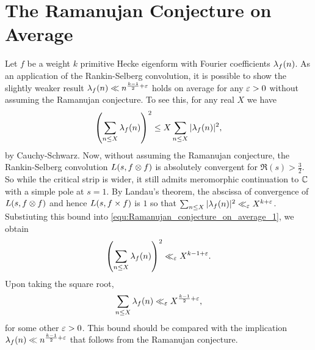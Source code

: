     \section{The Ramanujan Conjecture on Average}
      Let $f$ be a weight $k$ primitive Hecke eigenform with Fourier coefficients $\lambda_{f}(n)$. As an application of the Rankin-Selberg convolution, it is possible to show the slightly weaker result $\lambda_{f}(n) \ll n^{\frac{k-1}{2}+\varepsilon}$ holds on average for any $\varepsilon > 0$ without assuming the Ramanujan conjecture. To see this, for any real $X$ we have
      \begin{equation}\label{equ:Ramanujan_conjecture_on_average_1}
        \left(\sum_{n \le X}\lambda_{f}(n)\right)^{2} \le X\sum_{n \le X}|\lambda_{f}(n)|^{2},
      \end{equation}
      by Cauchy-Schwarz. Now, without assuming the Ramanujan conjecture, the Rankin-Selberg convolution $L(s,f \otimes f)$ is absolutely convergent for $\Re(s) > \frac{3}{2}$. So while the critical strip is wider, it still admits meromorphic continuation to $\mathbb{C}$ with a simple pole at $s = 1$. By Landau's theorem, the abscissa of convergence of $L(s,f \otimes f)$ and hence $L(s,f \times f)$ is $1$ so that $\sum_{n \le X}|\lambda_{f}(n)|^{2} \ll_{\varepsilon} X^{k+\varepsilon}$. Substiuting this bound into \cref{equ:Ramanujan_conjecture_on_average_1}, we obtain
      \[
        \left(\sum_{n \le X}\lambda_{f}(n)\right)^{2} \ll_{\varepsilon} X^{k-1+\varepsilon}.
      \]
      Upon taking the square root,
      \[
        \sum_{n \le X}\lambda_{f}(n) \ll_{\varepsilon} X^{\frac{k-1}{2}+\varepsilon},
      \]
      for some other $\varepsilon > 0$. This bound should be compared with the implication $\lambda_{f}(n) \ll n^{\frac{k-1}{2}+\varepsilon}$ that follows from the Ramanujan conjecture.